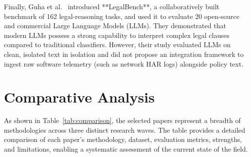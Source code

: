\documentclass[11pt,a4paper]{article}
\begin{document}
Finally, Guha et al.~\cite{guha-2023-legalbench} introduced **LegalBench**, a collaboratively built benchmark of 162 legal-reasoning tasks, and used it to evaluate 20 open-source and commercial Large Language Models (LLMs). They demonstrated that modern LLMs possess a strong capability to interpret complex legal clauses compared to traditional classifiers. However, their study evaluated LLMs on clean, isolated text in isolation and did not propose an integration framework to ingest raw software telemetry (such as network HAR logs) alongside policy text.

\section{Comparative Analysis}
As shown in Table~\ref{tab:comparison}, the selected papers represent a breadth of methodologies across three distinct research waves. The table provides a detailed comparison of each paper's methodology, dataset, evaluation metrics, strengths, and limitations, enabling a systematic assessment of the current state of the field.
\end{document}
